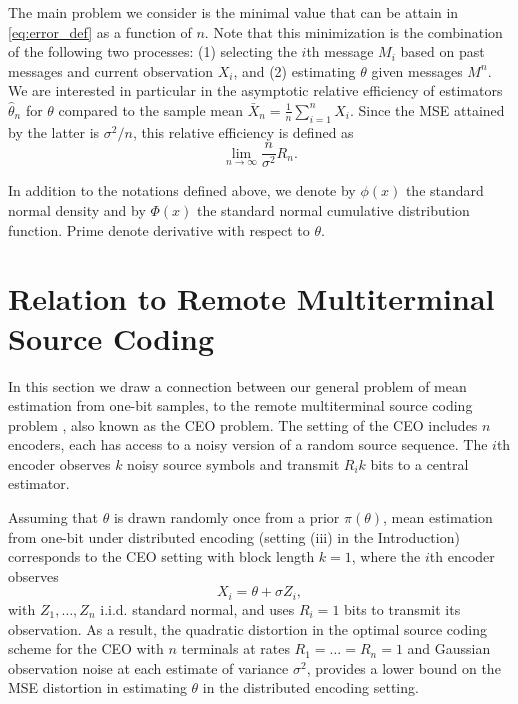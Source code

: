 \documentclass[letterpaper, conference]{IEEEtran}      %
\begin{document}
The main problem we consider is the minimal value that can be attain in \eqref{eq:error_def} as a function of $n$. Note that this minimization is the combination of the following two processes: (1) selecting the $i$th message $M_i$ based on past messages and current observation $X_i$, and (2) estimating $\theta$ given messages $M^n$. We are interested in particular in the asymptotic relative efficiency of estimators $\widehat{\theta}_n$ for $\theta$ compared to the sample mean $\bar{X}_n = \frac{1}{n} \sum_{i=1}^n X_i$. Since the MSE attained by the latter is $\sigma^2/n$, this relative efficiency is defined as
\begin{equation}
 \lim_{n \rightarrow \infty} \frac{n}{\sigma^2}  R_n. 
\label{eq:relative_efficiency}
\end{equation}

In addition to the notations defined above, we denote by $\phi(x)$ the standard normal density and by $\Phi(x)$ the standard normal cumulative distribution function. Prime denote derivative with respect to $\theta$.



\section{Relation to Remote Multiterminal Source Coding \label{sec:ceo}}
In this section we draw a connection between our general problem of mean estimation from one-bit samples, to the remote multiterminal source coding problem \cite{berger1996ceo}, also known as the CEO problem. The setting of the CEO includes $n$ encoders, each has access to a noisy version of a random source sequence. 
The $i$th encoder observes $k$ noisy source symbols and transmit $R_i k$ bits to a central estimator. \par
Assuming that $\theta$ is drawn randomly once from a prior $\pi(\theta)$, mean estimation from one-bit under distributed encoding (setting (iii) in the Introduction) corresponds to the CEO setting with block length $k=1$, where the $i$th encoder observes
\begin{equation}
\label{eq:Gaussian_channel}
X_i = \theta + \sigma Z_i,
\end{equation}
with $Z_1,\ldots,Z_n$ i.i.d. standard normal, and uses $R_i=1$ bits to transmit its observation. As a result, the quadratic distortion in the optimal source coding scheme for the CEO with $n$ terminals at rates $R_1 = \ldots = R_n = 1$ and Gaussian observation noise at each estimate of variance $\sigma^2$, provides a lower bound on the MSE distortion in estimating $\theta$ in the distributed encoding setting. 
 \\
\end{document}
